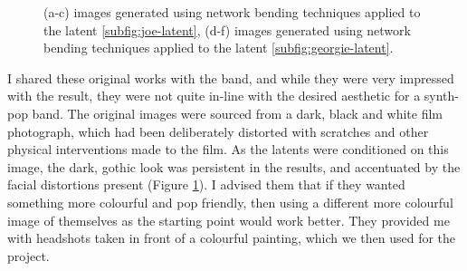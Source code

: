 \begin{figure}[!htbp]
    \hfill
    \hfill
    \hfill
    \caption[Network bending applied to 0171 headshots]{(a-c) images generated using network bending techniques applied to the latent \ref{subfig:joe-latent}, (d-f) images generated using network bending techniques applied to the latent \ref{subfig:georgie-latent}.}
    \label{fig:c7:0171-haunted}
 \end{figure}

I shared these original works with the band, and while they were very impressed with the result, they were not quite in-line with the desired aesthetic for a synth-pop band. 
The original images were sourced from a dark, black and white film photograph, which had been deliberately distorted with scratches and other physical interventions made to the film. 
As the latents were conditioned on this image, the dark, gothic look was persistent in the results, and accentuated by the facial distortions present (Figure \ref{fig:c7:0171-haunted}). 
I advised them that if they wanted something more colourful and pop friendly, then using a different more colourful image of themselves as the starting point would work better.
They provided me with headshots taken in front of a colourful painting, which we then used for the project. 

